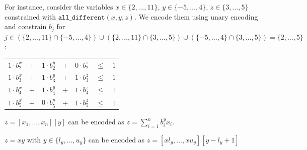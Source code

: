 \begin{description}
\begin{example}
            For instance, consider the variables $x \in \{ 2, \dots, 11 \}$, $y \in \{ -5, \dots, 4 \}$, $z \in \{ 3, \dots, 5 \}$
            constrained with $\texttt{all\_different}(x, y, z)$.
            We encode them using unary encoding and constrain $b_j$ for 
            $j \in (\{ 2, \dots, 11 \} \cap \{ -5, \dots, 4 \}) \cup (\{ 2, \dots, 11 \} \cap \{ 3, \dots, 5 \}) \cup (\{ -5, \dots, 4 \} \cap \{ 3, \dots, 5 \}) = \{ 2, \dots, 5 \}$:
            \begin{center}
                \begin{tabular}{ccccccc}
                    $1 \cdot b_2^x$ & $+$ & $1 \cdot b_2^y$ & $+$ & \color{lightgray}$0 \cdot b_2^z$ & $\leq$ & $1$ \\
                    $1 \cdot b_3^x$ & $+$ & $1 \cdot b_3^y$ & $+$ & $1 \cdot b_3^z$ & $\leq$ & $1$ \\
                    $1 \cdot b_4^x$ & $+$ & $1 \cdot b_4^y$ & $+$ & $1 \cdot b_4^z$ & $\leq$ & $1$ \\
                    $1 \cdot b_5^x$ & $+$ & \color{lightgray}$0 \cdot b_5^y$ & $+$ & $1 \cdot b_5^z$ & $\leq$ & $1$ \\
                \end{tabular}
            \end{center}
        \end{example}

        \begin{example}[Array]
            $z = [x_1, \dots, x_n][y]$ can be encoded as $z = \sum_{i=1}^{n} b_i^y x_i$.
        \end{example}

        \begin{example}
            $z = xy$ with $y \in \{ l_y, \dots, u_y \}$ can be encoded as $z = [xl_y, \dots, xu_y][y-l_y+1]$
        \end{example}
\end{description}